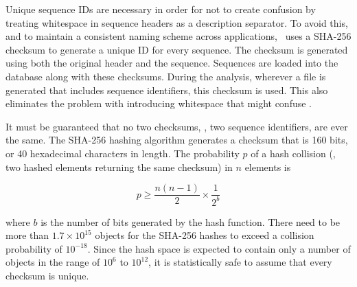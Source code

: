 \label{sec:checksums}
Unique sequence IDs are necessary in order for  not to create
confusion by treating whitespace in sequence headers as a description
separator. To avoid this, and to maintain a consistent naming scheme across
applications, \pname~uses a SHA-256 checksum to generate a unique ID for every
sequence. The checksum is generated using both the original header and the
sequence. Sequences are loaded into the database along with these checksums.
During the analysis, wherever a file is generated that includes sequence
identifiers, this checksum is used. This also eliminates the problem with
 introducing whitespace that might confuse
.

It must be guaranteed that no two checksums, \ie, two sequence identifiers, are
ever the same. The SHA-256 hashing algorithm generates a checksum that is 160 bits,
or 40 hexadecimal characters in length. The probability $p$ of a hash collision
(\ie, two hashed elements returning the same checksum) in $n$ elements is

\begin{equation}
p \ge \frac{n (n-1)}{2} \times \frac{1}{2^b}
\label{eq:hashcollision}
\end{equation}

where $b$ is the number of bits generated by the hash function. There need to be
more than $1.7 \times 10^{15}$ objects for the SHA-256 hashes to exceed a collision
probability of $10^{-18}$. Since the hash space is expected to contain only a
number of objects in the range of $10^6$ to $10^{12}$, it is statistically safe
to assume that every checksum is unique. 


